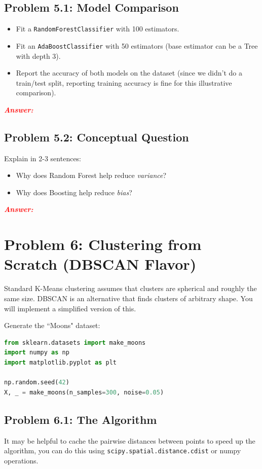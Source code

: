 \documentclass[11pt, letterpaper]{article}
\newcommand{\problem}[1]{\section*{Problem #1}}
\newcommand{\subproblem}[1]{\subsection*{Problem #1}}
\newcommand{\answer}{\textbf{\textit{\textcolor{red}{Answer:}}}}
\begin{document}
\subproblem{5.1: Model Comparison}
\begin{itemize}
    \item Fit a \texttt{RandomForestClassifier} with 100 estimators.
    \item Fit an \texttt{AdaBoostClassifier} with 50 estimators (base estimator can be a Tree with depth 3).
    \item Report the accuracy of both models on the dataset (since we didn't do a train/test split, reporting training accuracy is fine for this illustrative comparison).
\end{itemize}

\answer

\subproblem{5.2: Conceptual Question}
Explain in 2-3 sentences:
\begin{itemize}
    \item Why does Random Forest help reduce \textit{variance}?
    \item Why does Boosting help reduce \textit{bias}?
\end{itemize}

\answer

\problem{6: Clustering from Scratch (DBSCAN Flavor)}

Standard K-Means clustering assumes that clusters are spherical and roughly the same size. 
DBSCAN is an alternative that finds clusters of arbitrary shape. You will implement a simplified version of this.

Generate the ``Moons" dataset:
    \begin{lstlisting}[language=Python]
from sklearn.datasets import make_moons
import numpy as np
import matplotlib.pyplot as plt

np.random.seed(42)
X, _ = make_moons(n_samples=300, noise=0.05)\end{lstlisting}

\subproblem{6.1: The Algorithm}
It may be helpful to cache the pairwise distances between points to speed up the algorithm,
you can do this using \texttt{scipy.spatial.distance.cdist} or numpy operations.
\end{document}
